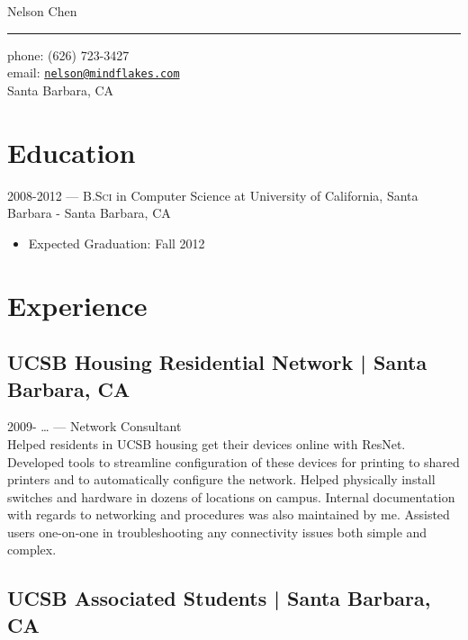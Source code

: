 \documentclass[10pt, letter]{article}
\makeatletter
\def\myname{Nelson Chen}
\def\myemail{nelson@mindflakes.com}
\def\mycellphone{(626) 723-3427}
\def\myaddress{Santa Barbara, CA}
\newcommand{\years}[1]{\marginnote{#1}}
\renewcommand{\years}[1]{#1 --- }
\makeatother
\begin{document}
{\LARGE \myname}\\
\hrule
\vspace{0.2in}
{\large phone: \mycellphone}\\[.05cm]
{\large email: \href{mailto:\myemail}{\texttt{\myemail}}}\\[.05cm]
\myaddress

\begin{multicols}{2}

\section*{Education}

\years{2008-2012} \textsc{B.Sci} in Computer Science at University of California, Santa Barbara - Santa Barbara, CA

\begin{itemize}
    \item Expected Graduation: Fall 2012
\end{itemize}

\section*{Experience}

\subsection*{UCSB Housing Residential Network | {\footnotesize{Santa Barbara, CA}}}

\years{2009- \ldots} Network Consultant\\
Helped residents in UCSB housing get their devices online with ResNet.
Developed tools to streamline configuration of these devices for printing to
shared printers and to automatically configure the network. Helped physically
install switches and hardware in dozens of locations on campus. Internal
documentation with regards to networking and procedures was also maintained by
me. Assisted users one-on-one in troubleshooting any connectivity issues both
simple and complex.

\subsection*{UCSB Associated Students | {\footnotesize{Santa Barbara, CA}}}


\end{multicols}
\end{document}
